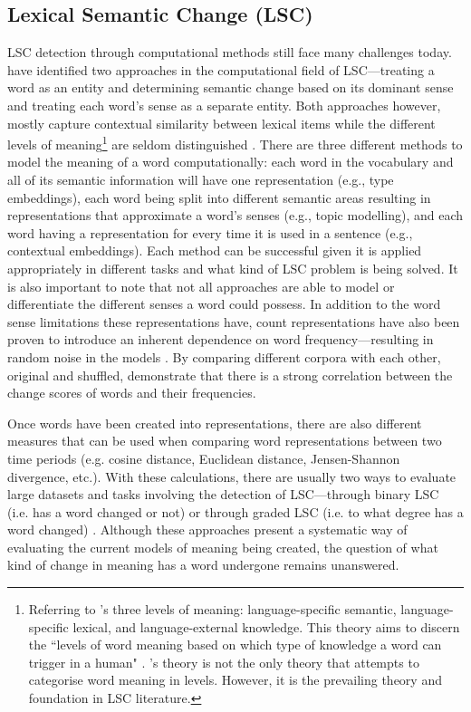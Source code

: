 \subsection{Lexical Semantic Change (LSC)}

LSC detection through computational methods still face many challenges today. \citet{hengchen2021challenges} have identified two approaches in the computational field of LSC—treating a word as an entity and determining semantic change based on its dominant sense and treating each word’s sense as a separate entity. Both approaches however, mostly capture contextual similarity between lexical items while the different levels of meaning\footnote{Referring to \citet{blank1997prinzipien}'s three levels of meaning: language-specific semantic, language-specific lexical, and language-external knowledge. This theory aims to discern the ``levels of word meaning based on which type of knowledge a word can trigger in a human" \citep{hengchen2021challenges}. \citet{blank1997prinzipien}'s theory is not the only theory that attempts to categorise word meaning in levels. However, it is the prevailing theory and foundation in LSC literature.} are seldom distinguished \citep{hengchen2021challenges}. There are three different methods to model the meaning of a word computationally: each word in the vocabulary and all of its semantic information will have one representation (e.g., type embeddings), each word being split into different semantic areas resulting in representations that approximate a word’s senses (e.g., topic modelling), and each word having a representation for every time it is used in a sentence (e.g., contextual embeddings). Each method can be successful given it is applied appropriately in different tasks and what kind of LSC problem is being solved. It is also important to note that not all approaches are able to model or differentiate the different senses a word could possess. In addition to the word sense limitations these representations have, count representations have also been proven to introduce an inherent dependence on word frequency—resulting in random noise in the models \citep{dubossarsky-etal-2017-outta}. By comparing different corpora with each other, original and shuffled, \citet{dubossarsky-etal-2017-outta} demonstrate that there is a strong correlation between the change scores of words and their frequencies. 

Once words have been created into representations, there are also different measures that can be used when comparing word representations between two time periods (e.g. cosine distance, Euclidean distance, Jensen-Shannon divergence, etc.). With these calculations, there are usually two ways to evaluate large datasets and tasks involving the detection of LSC—through binary LSC (i.e. has a word changed or not) or through graded LSC (i.e. to what degree has a word changed) \citep{schlectwegschulte2020}. Although these approaches present a systematic way of evaluating the current models of meaning being created, the question of what kind of change in meaning has a word undergone remains unanswered.

